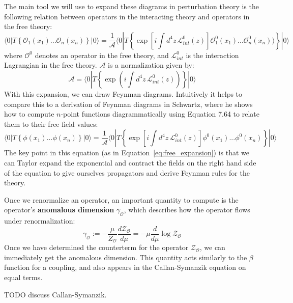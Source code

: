 \documentclass[11pt, oneside]{article}   	%
\theoremstyle{definition}
\begin{document}
The main tool we will use to expand these diagrams in perturbation theory is the following relation between operators  in 
the interacting theory and operators in the free theory:
\begin{equation}
	\langle 0 | T\left\{\mathcal O_1(x_1) ...\mathcal O_n(x_n)\right\} | 0 \rangle = \frac{1}{\mathcal A}\langle 0 | 
	T\left\{\exp\left[i\int d^4z\, \mathcal L_{int}^0(z)\right] \mathcal O_1^0(x_1) ... \mathcal O_n^0(x_n))\right\} | 0\rangle~
	\label{eq:free_expansion}
\end{equation}
where $\mathcal O^0$ denotes an operator in the free theory, and $\mathcal L_{int}^0$ is the interaction Lagrangian 
in the free theory. $\mathcal A$ is a normalization given by:
\begin{equation}
	\mathcal A = \langle 0 | T \left\{\exp\left(i\int d^4 z\,\mathcal L_{int}^0(z)\right)\right\} | 0\rangle
\end{equation}
With this expansion, we can draw Feynman diagrams. Intuitively it helps to compare this to a derivation of Feynman 
diagrams in Schwartz, where he shows how to compute $n$-point functions diagrammatically using Equation 7.64 to 
relate them to their free field values:
\begin{equation}
	\langle 0 | T\left\{\phi(x_1) ... \phi(x_n)\right\} | 0\rangle = \frac{1}{\mathcal A} \langle 0 | T\left\{\exp\left[i\int d^4z\, \mathcal 
	L_{int}^0(z)\right]\phi^0(x_1) ... \phi^0(x_n)\right\} | 0\rangle
\end{equation}
The key point in this equation (as in Equation~\ref{eq:free_expansion}) is that we can Taylor expand the exponential and 
contract the fields on the right hand side of the equation to give ourselves propagators and derive Feynman rules for the 
theory. 

Once we renormalize an operator, an important quantity to compute is the operator's \textbf{anomalous dimension} 
$\gamma_\mathcal{O}$, which describes how the operator flows under renormalization:
\begin{equation}
	\gamma_\mathcal{O} := -\frac{\mu}{Z_\mathcal{O}}\frac{d \mathcal{Z_{\mathcal O}}}{d\mu} = -\mu\frac{d}{d\mu}\log
	\mathcal Z_\mathcal{O}
\end{equation}
Once we have determined the counterterm for the operator $\mathcal{Z_\mathcal{O}}$, we can immediately get the anomalous 
dimension. This quantity acts similarly to the $\beta$ function for a coupling, and also appears in the Callan-Symanzik 
equation on equal terms. 

TODO discuss Callan-Symanzik.
\end{document}
